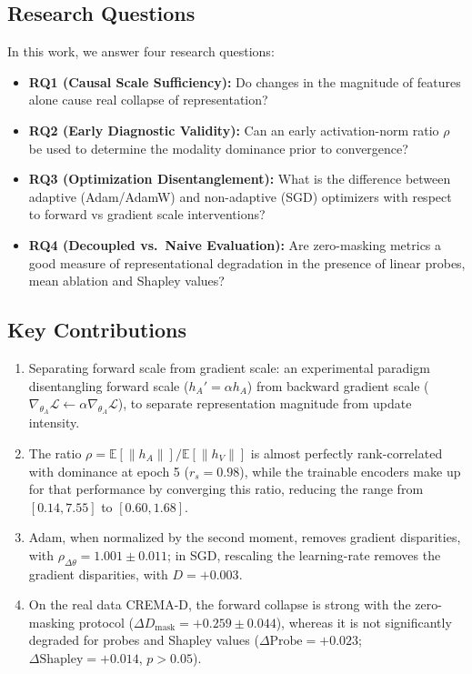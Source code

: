 \documentclass[conference]{IEEEtran}
\begin{document}
\subsection{Research Questions}
In this work, we answer four research questions:
\begin{itemize}
    \item \textbf{RQ1 (Causal Scale Sufficiency):} Do changes in the magnitude of features alone cause real collapse of representation?
    \item \textbf{RQ2 (Early Diagnostic Validity):} Can an early activation-norm ratio $\rho$ be used to determine the modality dominance prior to convergence?
    \item \textbf{RQ3 (Optimization Disentanglement):} What is the difference between adaptive (Adam/AdamW) and non-adaptive (SGD) optimizers with respect to forward vs gradient scale interventions?
    \item \textbf{RQ4 (Decoupled vs.\ Naive Evaluation):} Are zero-masking metrics a good measure of representational degradation in the presence of linear probes, mean ablation and Shapley values?
\end{itemize}

\subsection{Key Contributions}
\begin{enumerate}
    \item Separating forward scale from gradient scale: an experimental paradigm disentangling forward scale ($h_A' = \alpha h_A$) from backward gradient scale ($\nabla_{\theta_A}\mathcal{L} \leftarrow \alpha \nabla_{\theta_A}\mathcal{L}$), to separate representation magnitude from update intensity.
    \item The ratio $\rho = \mathbb{E}[\|h_A\|] / \mathbb{E}[\|h_V\|]$ is almost perfectly rank-correlated with dominance at epoch 5 ($r_s = 0.98$), while the trainable encoders make up for that performance by converging this ratio, reducing the range from $[0.14, 7.55]$ to $[0.60, 1.68]$.
    \item Adam, when normalized by the second moment, removes gradient disparities, with $\rho_{\Delta\theta} = 1.001 \pm 0.011$; in SGD, rescaling the learning-rate removes the gradient disparities, with $D = +0.003$.
    \item On the real data CREMA-D, the forward collapse is strong with the zero-masking protocol ($\Delta D_{\text{mask}} = +0.259 \pm 0.044$), whereas it is not significantly degraded for probes and Shapley values ($\Delta \text{Probe} = +0.023$; $\Delta \text{Shapley} = +0.014$, $p > 0.05$).
\end{enumerate}
\end{document}
